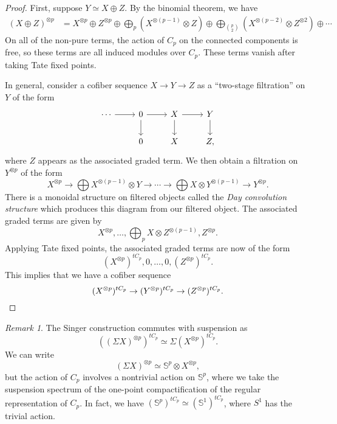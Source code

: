 \documentclass[10pt, oneside]{memoir}
\theoremstyle{definition}
\theoremstyle{remark}
\newtheorem{rmk}[thm]{Remark}
\theoremstyle{plain}
\theoremstyle{definition}
\theoremstyle{remark}
\newcommand{\bS}{\mathbb{S}}
\newcommand{\1}{\mathbf{1}}
\newcommand{\2}{\mathbf{2}}
\newcommand{\3}{\mathbf{3}}
\begin{document}
\begin{proof}
    First, suppose $Y \simeq X \oplus Z$. By the binomial theorem, we have
    \begin{align*}
        (X \oplus Z)^{\otimes p} &= X^{\otimes p} \oplus Z^{\otimes p} \oplus \bigoplus_p (X^{\otimes (p-1)} \otimes Z) \oplus \bigoplus_{\binom{p}{2}} (X^{\otimes (p-2)} \otimes Z^{\otimes 2})\oplus \cdots
    \end{align*}
    On all of the non-pure terms, the action of $C_p$ on the connected components is free, so these terms are all induced modules over $C_p$. These terms vanish after taking Tate fixed points.

    In general, consider a cofiber sequence $X \to Y \to Z$ as a ``two-stage filtration'' on $Y$ of the form
    \begin{equation*}
    \begin{tikzcd}
        \cdots \ar{r} & 0 \ar{r} \ar{d} & X \ar{r} \ar{d} & Y \ar{d} \\
        &  0 & X & Z,
    \end{tikzcd}
    \end{equation*}
    where $Z$ appears as the associated graded term. We then obtain a filtration on $Y^{\otimes p}$ of the form
    \[ X^{\otimes p} \to \bigoplus X^{\otimes (p-1)} \otimes Y \to \cdots \to \bigoplus X \otimes Y^{\otimes (p-1)} \to Y^{\otimes p}. \]
    There is a monoidal structure on filtered objects called the \textit{Day convolution structure} which produces this diagram from our filtered object. The associated graded terms are given by
    \[ X^{\otimes p}, \ldots, \bigoplus_p X \otimes Z^{\otimes (p-1)}, Z^{\otimes p}. \]
    Applying Tate fixed points, the associated graded terms are now of the form
    \[ (X^{\otimes p})^{tC_p}, 0, \ldots, 0, (Z^{\otimes p})^{t C_p}. \]
    This implies that we have a cofiber sequence
    \[ (X^{\otimes p})^{t C_p} \to (Y^{\otimes p})^{t C_p} \to (Z^{\otimes p})^{t C_p}. \qedhere \]
\end{proof}

\begin{rmk}
    The Singer construction commutes with suspension as
    \[ ((\Sigma X)^{\otimes p})^{t C_p} \simeq \Sigma (X^{\otimes p})^{t C_p}. \]
    We can write
    \[ (\Sigma X)^{\otimes p} \simeq \bS^p \otimes X^{\otimes p}, \]
    but the action of $C_p$ involves a nontrivial action on $\bS^p$, where we take the suspension spectrum of the one-point compactification of the regular representation of $C_p$. In fact, we have $(\bS^p)^{t C_p} \simeq (\bS^1)^{t C_p}$, where $S^1$ has the trivial action.
\end{rmk}
\end{document}
